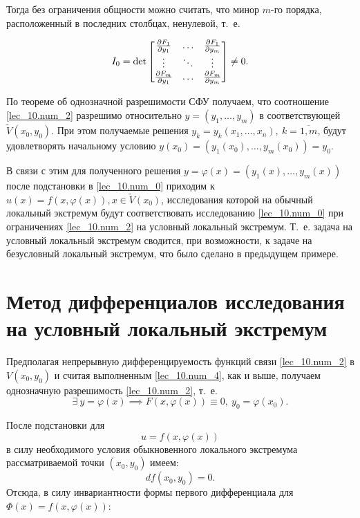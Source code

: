 \documentclass[../../main.tex]{subfiles}
\begin{document}
Тогда без ограничения общности можно считать, что минор
$m$-го порядка, расположенный в последних столбцах, ненулевой, т.~е.

\begin{equation} \label{lec_10.num_4}
	I_0 = \det \begin{bmatrix}
	\frac{\partial F_1}{\partial y_1} & \ldots & \frac{\partial F_1}{\partial y_m} \\
	\vdots & \ddots & \vdots \\
	\frac{\partial F_m}{\partial y_1} & \ldots & \frac{\partial F_m}{\partial y_m}
	\end{bmatrix} \ne 0.
\end{equation}

По теореме об однозначной разрешимости СФУ получаем, что 
соотношение \eqref{lec_10.num_2} разрешимо относительно $y = \left( 
y_1, \ldots, y_m \right)$ в соответствующей $\widetilde{V} (x_0, y_0)$.
При этом получаемые решения $y_k = y_k \left( x_1, \ldots, x_n 
\right),\ k = \overline{1, m}$, будут удовлетворять начальному условию
$y(x_0) = \left( y_1(x_0), \ldots, y_m(x_0) \right) = y_0$.

В связи с этим для полученного решения $y = \varphi(x) = \left( 
y_1(x), \ldots, y_m(x) \right)$ после подстановки в \eqref{lec_10.num_0} 
приходим к $u(x) = f( x, \varphi(x) ), x \in \widetilde{V}(x_0)$, 
исследования которой на обычный локальный экстремум будут 
соответствовать исследованию \eqref{lec_10.num_0} 
при ограничениях \eqref{lec_10.num_2} на условный локальный экстремум.
Т.~е. задача на условный локальный экстремум сводится, при возможности, 
к задаче на безусловный 
локальный экстремум, что было сделано в предыдущем примере.

\section{Метод дифференциалов исследования на условный локальный экстремум}

Предполагая непрерывную дифференцируемость функций связи \eqref{lec_10.num_2} 
в $V(x_0, y_0)$ и считая выполненным \eqref{lec_10.num_4}, как и выше,
получаем однозначную разрешимость \eqref{lec_10.num_2}, т.~е.
\[\exists\:y = \varphi(x) \implies F( x, \varphi(x)) \equiv 0,\ 
y_0 = \varphi(x_0).\]

После подстановки для
\begin{equation} \label{lec_10.num_5}
	u = f( x, \varphi(x) )
\end{equation}
в силу необходимого условия обыкновенного локального экстремума 
рассматриваемой точки $(x_0, y_0)$ имеем:
\[ df(x_0, y_0) = 0. \]
Отсюда, в силу инвариантности формы первого дифференциала для 
$\Phi(x) = f( x, \varphi(x) )$:
\end{document}
